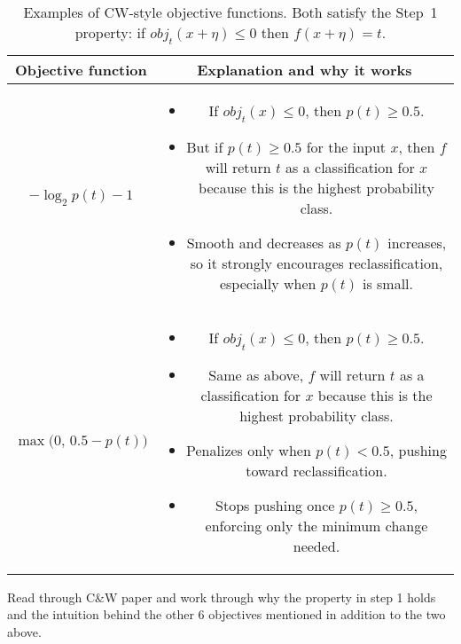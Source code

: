 \documentclass[11pt]{article}
\begin{document}
\begin{table}[h!]
\centering
\renewcommand{\arraystretch}{1.4}
\begin{tabular}{|c|c|}
\hline
\textbf{Objective function} & \textbf{Explanation and why it works} \\
\hline
$\displaystyle -\log_2 p(t) - 1$ &
\begin{minipage}[t]{0.65\textwidth}
\begin{itemize}[leftmargin=*]
    \item If $obj_t(x) \le 0$, then $p(t) \ge 0.5$.
    \item But if $p(t) \ge 0.5$ for the input $x$, then $f$ will return $t$ as a classification for $x$ because this is the highest probability class.
    \item Smooth and decreases as $p(t)$ increases, so it strongly encourages reclassification, especially when $p(t)$ is small.
\end{itemize}
\end{minipage} \\
\hline
$\displaystyle \max\!\bigl(0,\,0.5 - p(t)\bigr)$ &
\begin{minipage}[t]{0.65\textwidth}
\begin{itemize}[leftmargin=*]
    \item If $obj_t(x) \le 0$, then $p(t) \ge 0.5$.
    \item Same as above, $f$ will return $t$ as a classification for $x$ because this is the highest probability class.
    \item Penalizes only when $p(t) < 0.5$, pushing toward reclassification.
    \item Stops pushing once $p(t) \ge 0.5$, enforcing only the minimum change needed.
\end{itemize}
\end{minipage} \\
\hline
\end{tabular}
\caption{Examples of CW-style objective functions. Both satisfy the Step~1 property:
if $obj_t(x + \eta) \le 0$ then $f(x + \eta)=t$.} 
\end{table}

\begin{exercise}
	Read through C\&W paper \cite{carlini2017towards} and work through why the property in step 1 holds and the intuition behind the other 6 objectives mentioned in addition to the two above.
\end{exercise}
\end{document}
